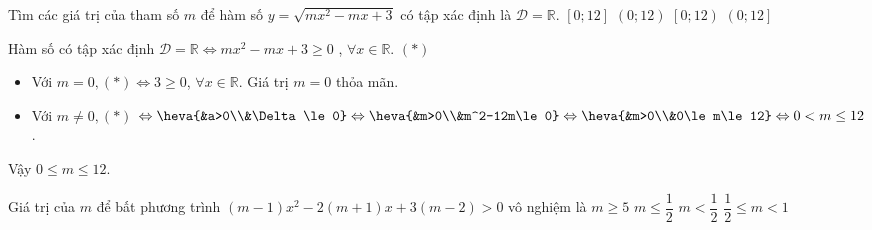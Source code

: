 \begin{ex}%
	Tìm các giá trị của tham số $m$ để hàm số $y=\sqrt{mx^2-mx+3}$ có tập xác định là $\mathscr{D}=\mathbb{R}$.
	\choice
	{\True $\left[0;12\right]$}
	{$(0;12)$}
	{$\left[0;12\right)$}
	{$\left(0;12\right]$}
	\loigiai
	{
	Hàm số có tập xác định $\mathscr{D}=\mathbb{R}\Leftrightarrow mx^2-mx+3\ge0$ , $\forall x \in \mathbb{R}$. $(*)$
	\begin{itemize}
	\item Với $m=0, (*) \Leftrightarrow 3\ge0$, $\forall x \in \mathbb{R}$. Giá trị $m=0$ thỏa mãn.
	\item Với $m \ne 0, (*)$ $ \Leftrightarrow \heva{&a>0\\&\Delta\le0} \Leftrightarrow \heva{&m>0\\&m^2-12m\le0} \Leftrightarrow \heva{&m>0\\&0\le m\le12}\Leftrightarrow 0<m\le12$.
	\end{itemize}
	Vậy $0 \le m \le 12$.
	}
\end{ex}
\begin{ex}%
	Giá trị của $m$ để bất phương trình $(m-1)x^2-2(m+1)x+3(m-2)>0$ vô nghiệm là	
	\choice
	{$m\ge 5$}
	{\True $m\le \dfrac{1}{2}$}
	{$m<\dfrac{1}{2}$}
	{$\dfrac{1}{2}\le m<1$}
\end{ex}
